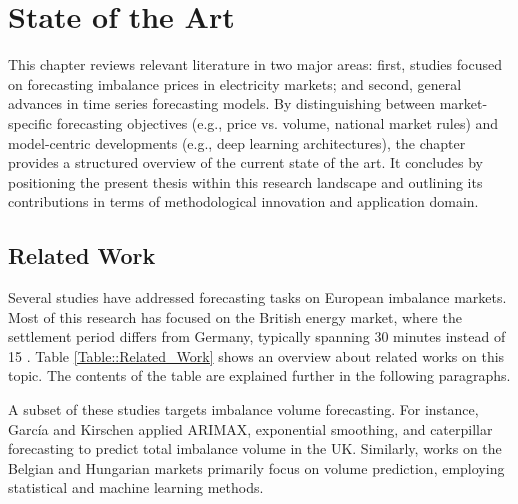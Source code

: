 \documentclass[class=scrbook, crop=false]{standalone}
\begin{document}
\chapter{State of the Art}
\label{Chapter::State_of_the_Art} %
This chapter reviews relevant literature in two major areas: first, studies focused on forecasting imbalance prices in electricity markets; and second, general advances in time series forecasting models. 
By distinguishing between market-specific forecasting objectives (e.g., price vs. volume, national market rules) and model-centric developments (e.g., deep learning architectures), the chapter provides a structured overview of the current state of the art.
 It concludes by positioning the present thesis within this research landscape and outlining its contributions in terms of methodological innovation and application domain.

\section{Related Work}
\label{Section::Related_Work}
Several studies have addressed forecasting tasks on European imbalance markets. Most of this research has focused on the British energy market, where the settlement period differs from Germany, typically spanning 30 minutes instead of 15 \cite{narajewskiProbabilisticForecastingGerman2022} \cite{limaBayesianPredictiveDistributions2023}. Table \ref{Table::Related_Work} shows an overview about related works on this topic. The contents of the table are explained further in the following paragraphs.

A subset of these studies targets imbalance volume forecasting. For instance, García and Kirschen \cite{garciaForecastingSystemImbalance2006} applied \gls{ARIMAX}, exponential smoothing, and caterpillar forecasting to predict total imbalance volume in the UK. Similarly, works on the Belgian \cite{bottieauVeryShortTermProbabilisticForecasting2020} \cite{dumasProbabilisticForecastingImbalance2019} and Hungarian  \cite{balazsShorttermSystemImbalance2024} markets primarily focus on volume prediction, employing statistical and machine learning methods.
\end{document}
